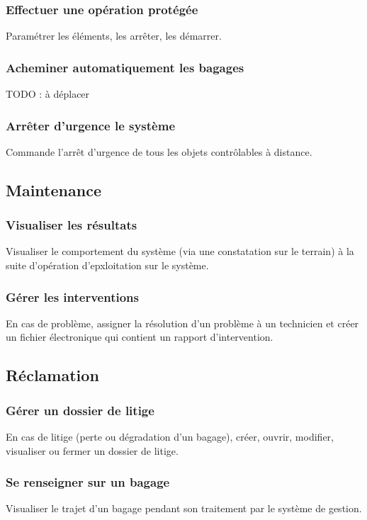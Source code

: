 \subsubsection{Effectuer une opération protégée}
Paramétrer les éléments, les arrêter, les démarrer.
\subsubsection{Acheminer automatiquement les bagages}
{\huge TODO : à déplacer}
\subsubsection{Arrêter d'urgence le système}
Commande l'arrêt d'urgence de tous les objets contrôlables à distance.
\subsection{Maintenance}
\subsubsection{Visualiser les résultats}
Visualiser le comportement du système (via une constatation sur le terrain) à la suite d'opération d'epxloitation sur le système.

\subsubsection{Gérer les interventions}
En cas de problème, assigner la résolution d'un problème à un technicien et créer un fichier électronique qui contient un rapport d'intervention.

\subsection{Réclamation}
\subsubsection{Gérer un dossier de litige}
En cas de litige (perte ou dégradation d'un bagage), créer, ouvrir, modifier, visualiser ou fermer un dossier de litige.

\subsubsection{Se renseigner sur un bagage}
Visualiser le trajet d'un bagage pendant son traitement par le système de gestion.
